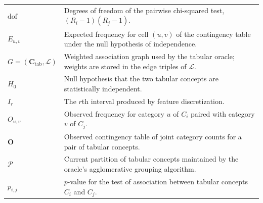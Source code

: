 \begin{longtable}{@{}>{\raggedright\arraybackslash}p{} p{}@{}}
	$\mathrm{dof}$                                     & Degrees of freedom of the pairwise chi-squared test, $(R_i-1)(R_j-1)$.                                                                                                                                             \\
	$E_{u,v}$                                          & Expected frequency for cell $(u,v)$ of the contingency table under the null hypothesis of independence.                                                                                                            \\
	$G=(\mathbf{C}_{\mathrm{tab}},\mathcal{L})$        & Weighted association graph used by the tabular oracle; weights are stored in the edge triples of $\mathcal{L}$.                                                                                                    \\
	$H_0$                                              & Null hypothesis that the two tabular concepts are statistically independent.                                                                                                                                       \\
	$I_r$                                              & The $r$th interval produced by feature discretization.                                                                                                                                                             \\
	$O_{u,v}$                                          & Observed frequency for category $u$ of $C_i$ paired with category $v$ of $C_j$.                                                                                                                                    \\
	$\mathbf{O}$                                       & Observed contingency table of joint category counts for a pair of tabular concepts.                                                                                                                                \\
	$\mathcal{P}$                                      & Current partition of tabular concepts maintained by the oracle's agglomerative grouping algorithm.                                                                                                                 \\
	$p_{i,j}$                                          & $p$-value for the test of association between tabular concepts $C_i$ and $C_j$.                                                                                                                                    \\

\end{longtable}
